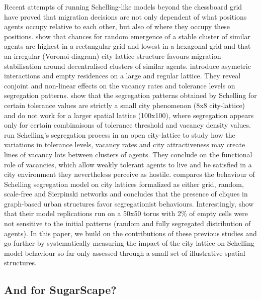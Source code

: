 \documentclass[Afour,sageh,times]{sagej}
\begin{document}
Recent attempts of running Schelling-like models beyond the chessboard grid have proved that migration decisions are not only dependent of what positions agents occupy relative to each other, but also of where they occupy these positions. \citet{FlacheHegselmann2001} show that chances for random emergence of a stable cluster of similar agents are highest in a rectangular grid and lowest in a hexagonal grid and that an irregular (Voronoi-diagram) city lattice structure favours migration stabilisation around decentralised clusters of similar agents. \citet{StaufferSolomon2007} introduce asymetric interactions and empty residences on a large and regular lattice. They reveal conjoint and non-linear effects on the vacancy rates and tolerance levels on segregation patterns. \citet{Singhetal2009} show that the segregation patterns obtained by Schelling for certain tolerance values are strictly a small city phenomenon (8x8 city-lattice) and do not work for a larger spatial lattice (100x100), where segregation appears only for certain combinaisons of tolerance threshold and vacancy density values. \citet{Gauvinetal2010} run Schelling's segregation process in an open city-lattice to study how the variations in tolerance levels, vacancy rates and city attractiveness may create lines of vacancy lots between clusters of agents. They conclude on the functional role of vacancies, which allow weakly tolerant agents to live and be satisfied in a city environment they nevertheless perceive as hostile. 
\citet{Banos2012} compares the behaviour of Schelling segregation model on city lattices formalized as either grid, random, scale-free and Sierpinski networks and concludes that the presence of cliques in graph-based urban structures favor segregationist behaviours. Interestingly, \citet{HatnaBenenson2012} show that their model replications run on a 50x50 torus with 2\% of empty cells were not sensitive to the initial patterns (random and fully segregated distribution of agents). In this paper, we build on the contributions of these previous studies and go further by systematically measuring the impact of the city lattice on Schelling model behaviour so far only assessed through a small set of illustrative spatial structures. 


\subsection{And for SugarScape?}



\end{document}
